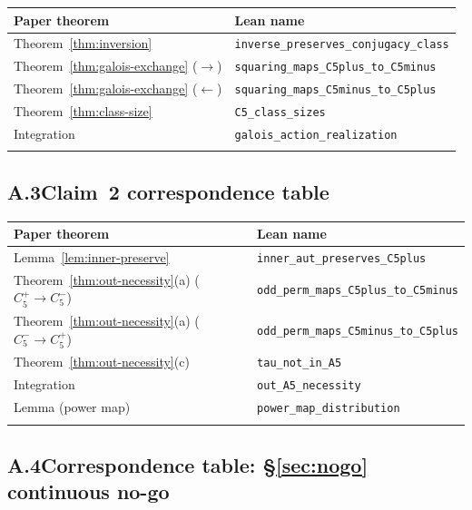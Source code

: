 \documentclass[sn-mathphys-num,Numbered]{sn-jnl}
\theoremstyle{thmstyleone}
\theoremstyle{thmstylethree}
\theoremstyle{thmstyletwo}
\begin{document}
\begin{appendices}
\vspace{6pt}
\noindent{}
\label{tab:lean-claim1}
\begin{tabular}{@{}p{5.5cm}p{6cm}@{}}
\toprule
Paper theorem & Lean name \\
\midrule
Theorem~\ref{thm:inversion} & \texttt{inverse\_preserves\_conjugacy\_class} \\
Theorem~\ref{thm:galois-exchange} ($\to$) &
  \texttt{squaring\_maps\_C5plus\_to\_C5minus} \\
Theorem~\ref{thm:galois-exchange} ($\leftarrow$) &
  \texttt{squaring\_maps\_C5minus\_to\_C5plus} \\
Theorem~\ref{thm:class-size} & \texttt{C5\_class\_sizes} \\
Integration & \texttt{galois\_action\_realization} \\
\botrule
\end{tabular}
\vspace{4pt}


\subsection*{A.3\quad Claim~2 correspondence table}


\vspace{6pt}
\noindent{}
\label{tab:lean-claim2}
\begin{tabular}{@{}p{5.5cm}p{6cm}@{}}
\toprule
Paper theorem & Lean name \\
\midrule
Lemma~\ref{lem:inner-preserve} &
  \texttt{inner\_aut\_preserves\_C5plus} \\
Theorem~\ref{thm:out-necessity}(a) ($C_5^+\to C_5^-$) &
  \texttt{odd\_perm\_maps\_C5plus\_to\_C5minus} \\
Theorem~\ref{thm:out-necessity}(a) ($C_5^-\to C_5^+$) &
  \texttt{odd\_perm\_maps\_C5minus\_to\_C5plus} \\
Theorem~\ref{thm:out-necessity}(c) &
  \texttt{tau\_not\_in\_A5} \\
Integration & \texttt{out\_A5\_necessity} \\
Lemma (power map) & \texttt{power\_map\_distribution} \\
\botrule
\end{tabular}
\vspace{4pt}


\subsection*{A.4\quad Correspondence table: \S\ref{sec:nogo} continuous no-go}



\end{appendices}
\end{document}
